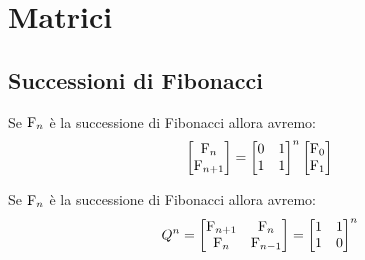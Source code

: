 \chapter{Matrici}
\section{Successioni di Fibonacci }
\begin{thm}
	Se $\mathrm{F}_{n}$ è la successione di Fibonacci allora avremo:
	\begin{equation}
		\begin{bmatrix}
			\mathrm{F}_{n}\\\mathrm{F}_{n+1}
		\end{bmatrix}=\begin{bmatrix}
			0&1\\ 1&1\\
		\end{bmatrix}^n\begin{bmatrix}
		\mathrm{F}_{0}\\\mathrm{F}_{1}
	\end{bmatrix}
	\end{equation}
\end{thm}
\begin{thm}
Se $\mathrm{F}_{n}$ è la successione di Fibonacci allora avremo:
\begin{equation}
Q^n=\begin{bmatrix}
	\mathrm{F}_{n+1}&\mathrm{F}_{n}\\\mathrm{F}_{n}&\mathrm{F}_{n-1}
\end{bmatrix}=\begin{bmatrix}
	1&1\\ 1&0\\
\end{bmatrix}^n
\end{equation}
\end{thm}\cite{Gould1981}
